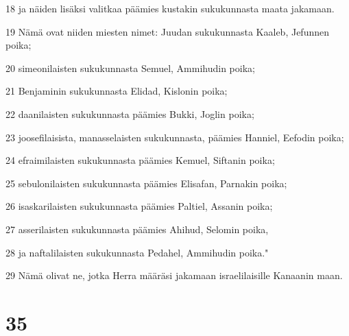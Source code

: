 \par 18 ja näiden lisäksi valitkaa päämies kustakin sukukunnasta maata jakamaan.
\par 19 Nämä ovat niiden miesten nimet: Juudan sukukunnasta Kaaleb, Jefunnen poika;
\par 20 simeonilaisten sukukunnasta Semuel, Ammihudin poika;
\par 21 Benjaminin sukukunnasta Elidad, Kislonin poika;
\par 22 daanilaisten sukukunnasta päämies Bukki, Joglin poika;
\par 23 joosefilaisista, manasselaisten sukukunnasta, päämies Hanniel, Eefodin poika;
\par 24 efraimilaisten sukukunnasta päämies Kemuel, Siftanin poika;
\par 25 sebulonilaisten sukukunnasta päämies Elisafan, Parnakin poika;
\par 26 isaskarilaisten sukukunnasta päämies Paltiel, Assanin poika;
\par 27 asserilaisten sukukunnasta päämies Ahihud, Selomin poika,
\par 28 ja naftalilaisten sukukunnasta Pedahel, Ammihudin poika."
\par 29 Nämä olivat ne, jotka Herra määräsi jakamaan israelilaisille Kanaanin maan.

\chapter{35}

